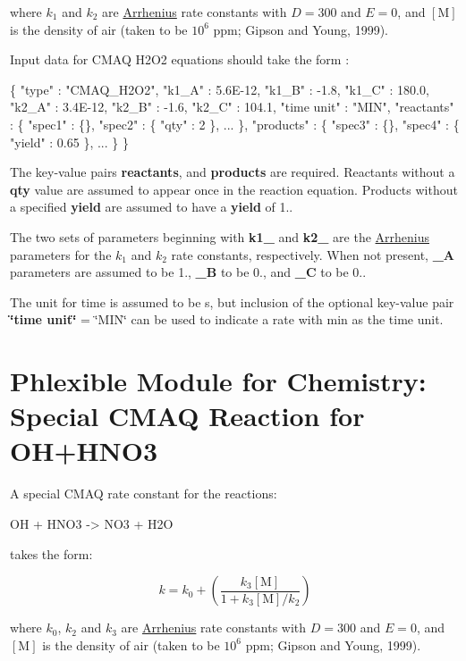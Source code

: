 where $k_1$ and $k_2$ are \mbox{\hyperlink{phlex_rxn_arrhenius}{Arrhenius}} rate constants with $D=300$ and $E=0$, and $[\mbox{M}]$ is the density of air (taken to be $10^6$ ppm; Gipson and Young, 1999).

Input data for C\+M\+AQ H2\+O2 equations should take the form \+: 
\begin{DoxyCode}
\{
  "type" : "CMAQ\_H2O2",
  "k1\_A" : 5.6E-12,
  "k1\_B" : -1.8,
  "k1\_C" : 180.0,
  "k2\_A" : 3.4E-12,
  "k2\_B" : -1.6,
  "k2\_C" : 104.1,
  "time unit" : "MIN",
  "reactants" : \{
    "spec1" : \{\},
    "spec2" : \{ "qty" : 2 \},
    ...
  \},
  "products" : \{
    "spec3" : \{\},
    "spec4" : \{ "yield" : 0.65 \},
    ...
  \}
\}
\end{DoxyCode}
 The key-\/value pairs {\bfseries reactants}, and {\bfseries products} are required. Reactants without a {\bfseries qty} value are assumed to appear once in the reaction equation. Products without a specified {\bfseries yield} are assumed to have a {\bfseries yield} of 1..

The two sets of parameters beginning with {\bfseries k1\+\_\+} and {\bfseries k2\+\_\+} are the \mbox{\hyperlink{phlex_rxn_arrhenius}{Arrhenius}} parameters for the $k_1$ and $k_2$ rate constants, respectively. When not present, {\bfseries \+\_\+A} parameters are assumed to be 1., {\bfseries \+\_\+B} to be 0., and {\bfseries \+\_\+C} to be 0..

The unit for time is assumed to be s, but inclusion of the optional key-\/value pair {\bfseries \char`\"{}time unit\char`\"{}} = \char`\"{}\+M\+I\+N\char`\"{} can be used to indicate a rate with min as the time unit. \hypertarget{phlex_rxn_CMAQ_OH_HNO3}{}\section{Phlexible Module for Chemistry\+: Special C\+M\+AQ Reaction for O\+H+\+H\+N\+O3}\label{phlex_rxn_CMAQ_OH_HNO3}
A special C\+M\+AQ rate constant for the reactions\+:

\begin{ch} OH + HNO3 -> NO3 + H2O \end{ch}

takes the form\+:

\[ k=k_0+(\frac{k_3[\mbox{M}]}{1+k_3[\mbox{M}]/k_2}) \]

where $k_0$, $k_2$ and $k_3$ are \mbox{\hyperlink{phlex_rxn_arrhenius}{Arrhenius}} rate constants with $D=300$ and $E=0$, and $[\mbox{M}]$ is the density of air (taken to be $10^6$ ppm; Gipson and Young, 1999).

